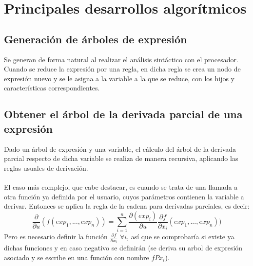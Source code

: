 \section{Principales desarrollos algorítmicos}

\subsection*{Generación de árboles de expresión}
Se generan de forma natural al realizar el análisis sintáctico con el procesador. Cuando se reduce la expresión por una regla, en dicha regla se crea un nodo de expresión nuevo y se le asigna a la variable a la que se reduce, con los hijos y características correspondientes.

\subsection*{Obtener el árbol de la derivada parcial de una expresión}
Dado un árbol de expresión y una variable, el cálculo del árbol de la derivada parcial respecto de dicha variable se realiza de manera recursiva, aplicando las reglas usuales de derivación. \\
\\El caso más complejo, que cabe destacar, es cuando se trata de una llamada a otra función ya definida por el usuario, cuyos parámetros contienen la variable a derivar. Entonces se aplica la regla de la cadena para derivadas parciales, es decir:
$$\frac{\partial}{\partial u}(f(exp_1, ..., exp_n)) = \sum_{i=1}^{n} \frac{\partial (exp_i)}{\partial u} \frac{\partial f}{\partial x_i}(exp_1, ..., exp_n))$$
Pero es necesario definir la función $\frac{\partial f}{\partial x_i}$ $\forall i$, así que se comprobaría si existe ya dichas funciones y en caso negativo se definirán (se deriva su arbol de expresión asociado y se escribe en una función con nombre $fPx_i$).

